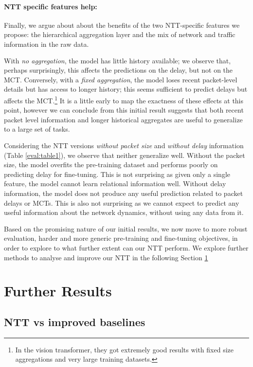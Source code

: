 \paragraph*{NTT specific features help:}
Finally, we argue about about the benefits of the two NTT-specific features we propose: \ie the hierarchical aggregation layer and the mix of network and traffic information in the raw data.

With \emph{no aggregation}, the model has little history available; we observe that, perhaps surprisingly, this affects the predictions on the delay, but not on the MCT. Conversely, with a \emph{fixed aggregation}, the model loses recent packet-level details but has access to longer history; this seems sufficient to predict delays but affects the MCT.\footnote{In the vision transformer\cite{dosovitskiyImageWorth16x162021}, they got extremely good results with fixed size aggregations and very large training datasets.}
It is a little early to map the exactness of these effects at this point, however we can conclude from this initial result suggests that both recent packet level information and longer historical aggregates are useful to generalize to a large set of tasks.


Considering the NTT versions \emph{without packet size} and \emph{without delay} information (Table \ref{eval:table1}), we observe that neither generalize well.
Without the packet size, the model overfits the pre-training dataset and performs poorly on predicting delay for fine-tuning. This is not surprising as given only a single feature, the model cannot learn relational information well.
Without delay information, the model does not produce any useful prediction related to packet delays or MCTs. This is also not surprising as we cannot expect to predict any useful information about the network dynamics, without using any data from it.


Based on the promising nature of our initial results, we now move to more robust evaluation, harder and more generic pre-training and fine-tuning objectives, in order to explore to what further extent can our NTT perform. We explore further methods to analyse and improve our NTT in the following Section \ref{eval:fres}


\section{Further Results}
\label{eval:fres}

\subsection{NTT vs improved baselines}
\label{ssec:impbase}

